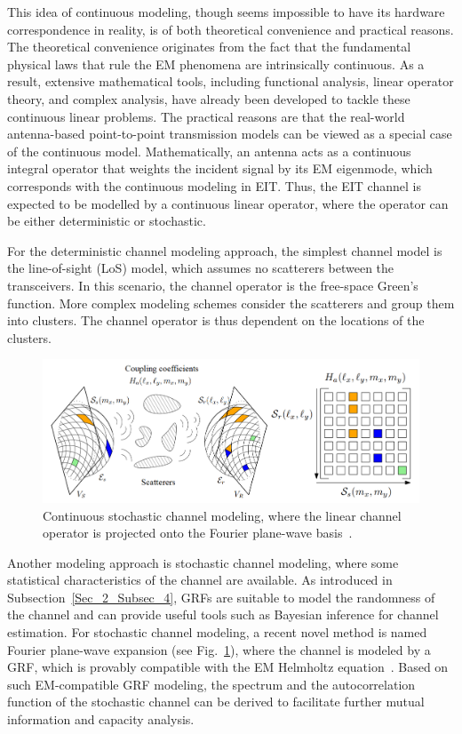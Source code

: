 \documentclass[journal,twocolumn]{IEEEtran}
\begin{document}
This idea of continuous modeling, though seems impossible to have its hardware correspondence in reality, is of both theoretical convenience and practical reasons. 
The theoretical convenience originates from the fact that the fundamental physical laws that rule the EM phenomena are intrinsically continuous. 
As a result, extensive mathematical tools, including functional analysis, linear operator theory, and complex analysis, have already been developed to tackle these continuous linear problems. 
The practical reasons are that the real-world antenna-based point-to-point transmission models can be viewed as a special case of the continuous model. 
Mathematically, an antenna acts as a continuous integral operator that weights the incident signal by its EM eigenmode, which corresponds with the continuous modeling in EIT. 
Thus, the EIT channel is expected to be modelled by a continuous linear operator, where the operator can be either deterministic or stochastic.

For the deterministic channel modeling approach, the simplest channel model is the line-of-sight (LoS) model, which assumes no scatterers between the transceivers. In this scenario, the channel operator is the free-space Green's function. More complex modeling schemes consider the scatterers and group them into clusters. The channel operator is thus dependent on the locations of the clusters.

\begin{figure}
	\centering 
	\includegraphics[width=\linewidth]{figures/random_channel-new.png} 
	\caption{Continuous stochastic channel modeling, where the linear channel operator is projected onto the Fourier plane-wave basis~\cite{marzetta2022fourier}.} 
	\label{fig:marzetta}
\end{figure}
Another modeling approach is stochastic channel modeling, where some statistical characteristics of the channel are available. As introduced in Subsection~\ref{Sec_2_Subsec_4}, GRFs are suitable to model the randomness of the channel and can provide useful tools such as Bayesian inference for channel estimation. 
For stochastic channel modeling, a recent novel method is named Fourier plane-wave expansion (see Fig.~\ref{fig:marzetta}), where the channel is modeled by a GRF, which is provably compatible with the EM Helmholtz equation~\cite{marzetta2022fourier}. 
Based on such EM-compatible GRF modeling, the spectrum and the autocorrelation function of the stochastic channel can be derived to facilitate further mutual information and capacity analysis.
\end{document}
